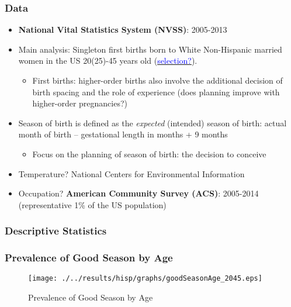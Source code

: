 \documentclass[10pt,letterpaper,subeqn]{beamer}
\begin{document}
\begin{frame}[label=Data]
\frametitle{Data}
\begin{itemize}
\item \textbf{National Vital Statistics System (NVSS)}: 2005-2013
\item Main analysis: Singleton first births born to White Non-Hispanic married women in the US 20(25)-45 years old (\hyperlink{ageHist}{\textcolor{blue}{selection?}}).
\begin{itemize}
\item First births: higher-order births also involve the additional decision of birth spacing and the role of experience (does planning improve with higher-order pregnancies?)
\end{itemize}
\item Season of birth is defined as the \emph{expected} (intended) season of birth: actual month of birth --  gestational length in months + 9 months
\begin{itemize}
\item Focus on the planning of season of birth: the decision to conceive
\end{itemize}
\item Temperature? National Centers for Environmental Information
\item Occupation? \textbf{American Community Survey (ACS)}: 2005-2014 (representative 1\% of the US population)
\end{itemize}
\end{frame}


\begin{frame}
\frametitle{Descriptive Statistics}

\end{frame}


\begin{frame}[label=ages]
\frametitle{Prevalence of Good Season by Age}
\begin{figure}[htpb!]
  \begin{center}
    \caption{Prevalence of Good Season by Age}
    \texttt{[image: ./../results/hisp/graphs/goodSeasonAge\_2045.eps]}
    \label{fig:goodByAge}
  \end{center}
\end{figure}
\end{frame}
\end{document}
